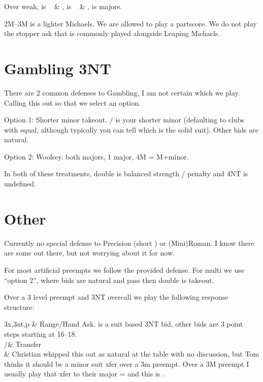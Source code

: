 \documentclass[main]{subfile}
\begin{document}
	Over  weak,  is \ccc~ \& \hhh,  is \ccc~ \& \sss,  is majors.
	
	2M--3M is a lighter Michaels. We are allowed to play a partscore. We do not play the stopper ask that is commonly played alongside Leaping Michaels.
		
	\section{Gambling 3NT}
	
	There are 2 common defenses to Gambling, I am not certain which we play. Calling this out so that we select an option.
	
	Option 1:  Shorter minor takeout. / is your shorter minor (defaulting to clubs with equal, although typically you can tell which is the solid suit). Other bids are natural.
	
	Option 2:  Woolsey.  both majors,  1 major, 4M = M+minor.
	
	In both of these treatments, double is balanced strength / penalty and 4NT is undefined.
	
	\section{Other}
	
	Currently no special defense to  Precision (short \ddd) or (Mini)Roman. I know there are some out there, but not worrying about it for now.
	
	For most artificial preempts we follow the provided defense. For multi we use ``option 2'', where bids are natural and pass then double is takeout.
	
	Over a 3 level preempt and 3NT overcall we play the following response structure:
	
	\begin{compbidtable}{3x,3nt,p}
		 & Range/Hand Ask.   is a suit based 3NT bid, other bids are 3 point steps starting at 16--18. \\
		/\hhh & Transfer \\
		 & Christian whipped this out as natural at the table with no discussion, but Tom thinks it should be a minor suit xfer over a 3m preempt.  Over a 3M preempt I usually play that xfer to their major = \ccc and this is \ddd.
	\end{compbidtable}
	
\end{document}
